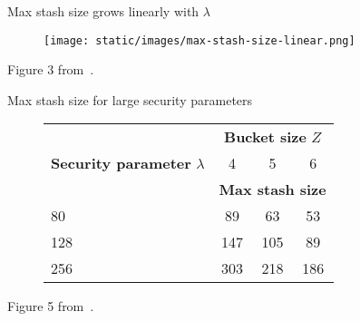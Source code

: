 
\begin{frame}{Max stash size grows linearly with $\lambda$}
	
	\begin{center}

		\begin{figure}
				
			\texttt{[image: static/images/max-stash-size-linear.png]}
				
		\end{figure}
		
	\end{center}

	Figure 3 from~\cite{Stefanov:2013:POE:2508859.2516660}.

\end{frame}

\begin{frame}{Max stash size for large security parameters}
	
	\begin{center}

		\begin{figure}

			\begin{tabular}{ l c c c }

				\toprule%

				\multirow{3}{*}{\textbf{Security parameter} $\lambda$}	& \multicolumn{3}{c}{\textbf{Bucket size} $Z$}					\\
																		& 4												& 5		& 6		\\
																		& \multicolumn{3}{c}{\textbf{Max stash size}}					\\

				\midrule%

				80														& 89											& 63	& 53	\\
				128														& 147											& 105	& 89	\\
				256														& 303											& 218	& 186	\\

				\bottomrule%

			\end{tabular}

		\end{figure}

	\end{center}

	Figure 5 from~\cite{Stefanov:2013:POE:2508859.2516660}.

\end{frame}


